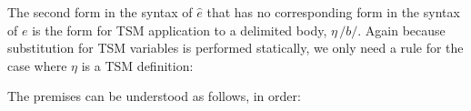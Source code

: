 The second form in the syntax of $\hat{e}$ that has no corresponding form in the syntax of $e$ is the form for TSM application to a delimited body, $\eta\,\texttt{/}b\texttt{/}$. Again because substitution for TSM variables is performed statically, we only need a rule for the case where $\eta$ is a TSM definition:
\begin{mathpar}
\end{mathpar}
The premises can be understood as follows, in order:
